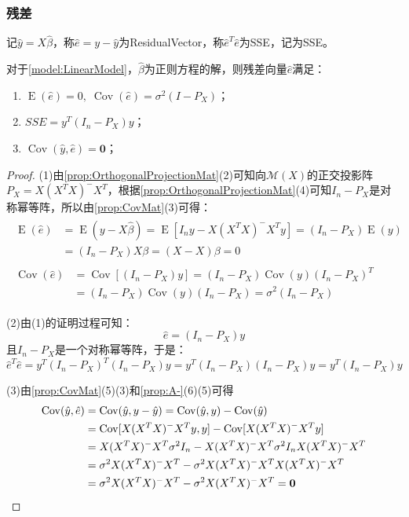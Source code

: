 \subsubsection{残差}
\begin{definition}
	记$\hat{y}=X\hat{\beta}$，称$\hat{e}=y-\hat{y}$为\gls{ResidualVector}，称$\hat{e}^T\hat{e}$为\gls{SSE}，记为SSE。
\end{definition}
\begin{property}\label{prop:ehat}
	对于\cref{model:LinearModel}，$\hat{\beta}$为正则方程的解，则残差向量$\hat{e}$满足：
	\begin{enumerate}
		\item $\operatorname{E}(\hat{e})=0,\;\operatorname{Cov}(\hat{e})=\sigma^2(I-P_X)$；
		\item $SSE=y^T(I_n-P_X)y$；
		\item $\operatorname{Cov}(\hat{y},\hat{e})=\mathbf{0}$；
	\end{enumerate}
\end{property}
\begin{proof}
	(1)由\cref{prop:OrthogonalProjectionMat}(2)可知向$\mathcal{M}(X)$的正交投影阵$P_X=X(X^TX)^-X^T$，根据\cref{prop:OrthogonalProjectionMat}(4)可知$I_n-P_X$是对称幂等阵，所以由\cref{prop:CovMat}(3)可得：
	\begin{gather*}
		\begin{aligned}
			\operatorname{E}(\hat{e})&=\operatorname{E}(y-X\hat{\beta})=\operatorname{E}[I_ny-X(X^TX)^-X^Ty]=(I_n-P_X)\operatorname{E}(y) \\
			&=(I_n-P_X)X\beta=(X-X)\beta=0
		\end{aligned} \\
		\begin{aligned}
			\operatorname{Cov}(\hat{e})&=\operatorname{Cov}[(I_n-P_X)y]=(I_n-P_X)\operatorname{Cov}(y)(I_n-P_X)^T \\
			&=(I_n-P_X)\operatorname{Cov}(y)(I_n-P_X)=\sigma^2(I_n-P_X)
		\end{aligned}
	\end{gather*}\par
	(2)由(1)的证明过程可知：
	\begin{equation*}
		\hat{e}=(I_n-P_X)y
	\end{equation*}
	且$I_n-P_X$是一个对称幂等阵，于是：
	\begin{equation*}
		\hat{e}^T\hat{e}=y^T(I_n-P_X)^T(I_n-P_X)y=y^T(I_n-P_X)(I_n-P_X)y=y^T(I_n-P_X)y
	\end{equation*}\par
	(3)由\cref{prop:CovMat}(5)(3)和\cref{prop:A-}(6)(5)可得
	\begin{align*}
		\operatorname{Cov}(\hat{y},\hat{e})&=\operatorname{Cov}(\hat{y},y-\hat{y})=\operatorname{Cov}(\hat{y},y)-\operatorname{Cov}(\hat{y}) \\
		&=\operatorname{Cov}[X(X^TX)^-X^Ty,y]-\operatorname{Cov}[X(X^TX)^-X^Ty] \\
		&=X(X^TX)^-X^T\sigma^2I_n-X(X^TX)^-X^T\sigma^2I_nX(X^TX)^-X^T \\
		&=\sigma^2X(X^TX)^-X^T-\sigma^2X(X^TX)^-X^TX(X^TX)^-X^T \\
		&=\sigma^2X(X^TX)^-X^T-\sigma^2X(X^TX)^-X^T=\mathbf{0}\qedhere
	\end{align*}
\end{proof}
